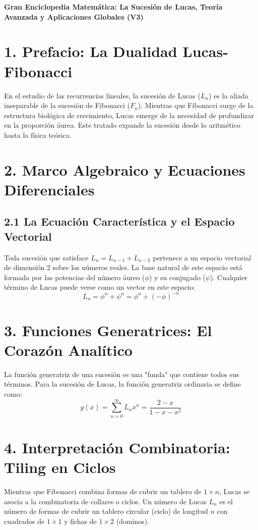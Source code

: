 \documentclass[11pt]{article}
\begin{document}
\begin{center}
    \begin{tcolorbox}[colback=tituloPrincipal, colframe=tituloPrincipal, arc=3pt, center title, inner topsep=10pt, inner bottomsep=10pt]
        \color{white} \LARGE \textbf{Gran Enciclopedia Matemática: La Sucesión de Lucas, Teoría Avanzada y Aplicaciones Globales (V3)}
    \end{tcolorbox}
\end{center}

\section*{1. Prefacio: La Dualidad Lucas-Fibonacci}
En el estudio de las recurrencias lineales, la sucesión de Lucas ($L_n$) es la aliada inseparable de la sucesión de Fibonacci ($F_n$). Mientras que Fibonacci surge de la estructura biológica de crecimiento, Lucas emerge de la necesidad de profundizar en la proporción áurea. Este tratado expande la sucesión desde lo aritmético hasta la física teórica.

\section*{2. Marco Algebraico y Ecuaciones Diferenciales}
\subsection*{2.1 La Ecuación Característica y el Espacio Vectorial}
Toda sucesión que satisface $L_n = L_{n-1} + L_{n-2}$ pertenece a un espacio vectorial de dimensión 2 sobre los números reales. La base natural de este espacio está formada por las potencias del número áureo ($\phi$) y su conjugado ($\psi$). Cualquier término de Lucas puede verse como un vector en este espacio:
{\color{colorFormula}
\[ L_n = \phi^n + \psi^n = \phi^n + (-\phi)^{-n} \]}

\section*{3. Funciones Generatrices: El Corazón Analítico}
La función generatriz de una sucesión es una "funda" que contiene todos sus términos. Para la sucesión de Lucas, la función generatriz ordinaria se define como:
{\color{colorFormula}
\[ g(x) = \sum_{n=0}^{\infty} L_n x^n = \frac{2-x}{1-x-x^2} \]}

\section*{4. Interpretación Combinatoria: Tiling en Ciclos}
Mientras que Fibonacci combina formas de cubrir un tablero de $1 \times n$, Lucas se asocia a la combinatoria de collares o ciclos. Un número de Lucas $L_n$ es el número de formas de cubrir un tablero circular (ciclo) de longitud $n$ con cuadrados de $1 \times 1$ y fichas de $1 \times 2$ (dominos).
\end{document}
